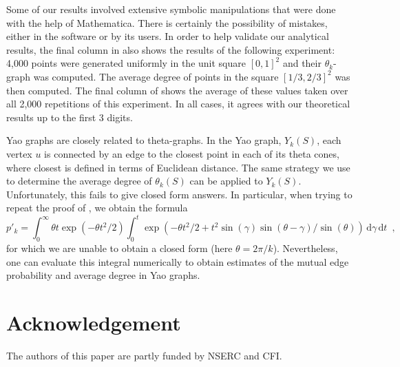 \documentclass{patmorin}
\begin{document}
Some of our results involved extensive symbolic manipulations that were
done with the help of Mathematica.  There is certainly the possibility
of mistakes, either in the software or by its users.  In order to help
validate our analytical results, the final column in  also
shows the results of the following experiment: 4,000 points were generated
uniformly in the unit square $[0,1]^2$ and their $\theta_k$-graph was
computed.  The average degree of points in the square $[1/3,2/3]^2$ was
then computed.  The final column of  shows the average of
these values taken over all 2,000 repetitions of this experiment.  In all
cases, it agrees with our theoretical results up to the first 3 digits.

Yao graphs \cite{flinchbaugh.jones:strong,yao:on} are closely related to
theta-graphs.  In the Yao graph, $Y_k(S)$, each vertex $u$ is connected by
an edge to the closest point in each of its  theta cones, where closest
is defined in terms of Euclidean distance.  The same strategy we use to
determine the average degree of $\theta_k(S)$ can be applied to $Y_k(S)$.
Unfortunately, this fails to give closed form answers.  In particular,
when trying to repeat the proof of , we obtain the formula
\[
  p'_k = \int_0^\infty \theta t\exp(-\theta t^2/2) \int_0^t \exp(-\theta t^2/2+t^2\sin(\gamma)\sin(\theta-\gamma)/\sin(\theta))\,\mathrm d\gamma\, \mathrm dt \enspace ,
\]
for which we are unable to obtain a closed form (here $\theta=2\pi/k$).
Nevertheless, one can evaluate this integral numerically to obtain
estimates of the mutual edge probability and average degree in Yao graphs.

\section*{Acknowledgement}

The authors of this paper are partly funded by NSERC and CFI.



\end{document}
